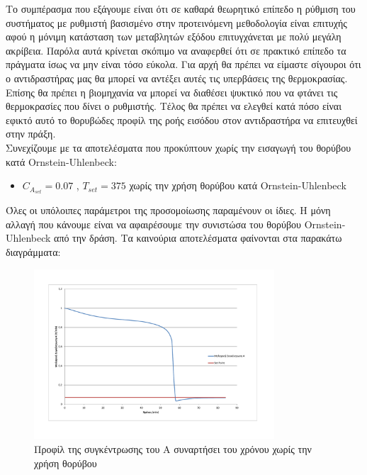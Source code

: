 \documentclass[11pt]{article} %
\numberwithin{equation}{subsection}
\begin{document}
Το συμπέρασμα που εξάγουμε είναι ότι σε καθαρά θεωρητικό επίπεδο η ρύθμιση του συστήματος με ρυθμιστή βασισμένο στην προτεινόμενη μεθοδολογία είναι επιτυχής αφού η μόνιμη κατάσταση των μεταβλητών εξόδου επιτυγχάνεται με πολύ μεγάλη ακρίβεια. Παρόλα αυτά κρίνεται σκόπιμο να αναφερθεί ότι σε πρακτικό επίπεδο τα πράγματα ίσως να μην είναι τόσο εύκολα. Για αρχή θα πρέπει να είμαστε σίγουροι ότι ο αντιδραστήρας μας θα μπορεί να αντέξει αυτές τις υπερβάσεις της θερμοκρασίας. Επίσης θα πρέπει η βιομηχανία να μπορεί να διαθέσει ψυκτικό που να φτάνει τις θερμοκρασίες που δίνει ο ρυθμιστής. Τέλος θα πρέπει να ελεγθεί κατά πόσο είναι εφικτό αυτό το θορυβώδες προφίλ της ροής εισόδου στον αντιδραστήρα να επιτευχθεί στην πράξη. \\

Συνεχίζουμε με τα αποτελέσματα που προκύπτουν χωρίς την εισαγωγή του θορύβου κατά Ornstein-Uhlenbeck:\\

\begin{itemize}
\item $C_{A_{set}} = 0.07$ , $Τ_{set} = 375$ χωρίς την χρήση θορύβου κατά Ornstein-Uhlenbeck
\end{itemize}
Όλες οι υπόλοιπες παράμετροι της προσομοίωσης παραμένουν οι ίδιες. Η μόνη αλλαγή που κάνουμε είναι να αφαιρέσουμε την συνιστώσα του θορύβου Ornstein-Uhlenbeck από την δράση. Τα καινούρια αποτελέσματα φαίνονται στα παρακάτω διαγράμματα:
\begin{figure}[H]
    \centering
    \includegraphics[width=0.8\textwidth]{no_noise_ca.pdf}
    \caption{Προφίλ της συγκέντρωσης του Α συναρτήσει του χρόνου χωρίς την χρήση θορύβου}
    \label{fig:no_noise_ca}
\end{figure}
\end{document}
